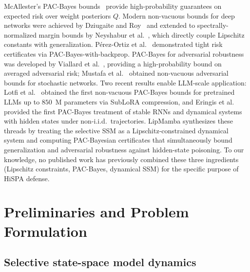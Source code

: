 \documentclass[12pt,a4paper]{article}
\theoremstyle{definition}
\theoremstyle{remark}
\newcommand{\modelname}{LipMamba}
\begin{document}
McAllester's PAC-Bayes bounds~\cite{mcallester2003pac} provide high-probability guarantees on expected risk over weight posteriors $Q$. Modern non-vacuous bounds for deep networks were achieved by Dziugaite and Roy~\cite{dziugaite2017computing} and extended to spectrally-normalized margin bounds by Neyshabur et al.~\cite{neyshabur2018pac}, which directly couple Lipschitz constants with generalization. Pérez-Ortiz et al.~\cite{perezortiz2021tighter} demonstrated tight risk certificates via PAC-Bayes-with-backprop. PAC-Bayes for adversarial robustness was developed by Viallard et al.~\cite{viallard2021pacbayes}, providing a high-probability bound on averaged adversarial risk; Mustafa et al.~\cite{mustafa2024nonvacuous} obtained non-vacuous adversarial bounds for stochastic networks. Two recent results enable LLM-scale application: Lotfi et al.~\cite{lotfi2024nonvacuous} obtained the first non-vacuous PAC-Bayes bounds for pretrained LLMs up to $850$~M parameters via SubLoRA compression, and Eringis et al.~\cite{eringis2024pacbayes} provided the first PAC-Bayes treatment of stable RNNs and dynamical systems with hidden states under non-i.i.d.\ trajectories. \modelname{} synthesizes these threads by treating the selective SSM as a Lipschitz-constrained dynamical system and computing PAC-Bayesian certificates that simultaneously bound generalization and adversarial robustness against hidden-state poisoning. To our knowledge, no published work has previously combined these three ingredients (Lipschitz constraints, PAC-Bayes, dynamical SSM) for the specific purpose of HiSPA defense.


\section{Preliminaries and Problem Formulation}
\label{sec:preliminaries}

\subsection{Selective state-space model dynamics}
\end{document}
